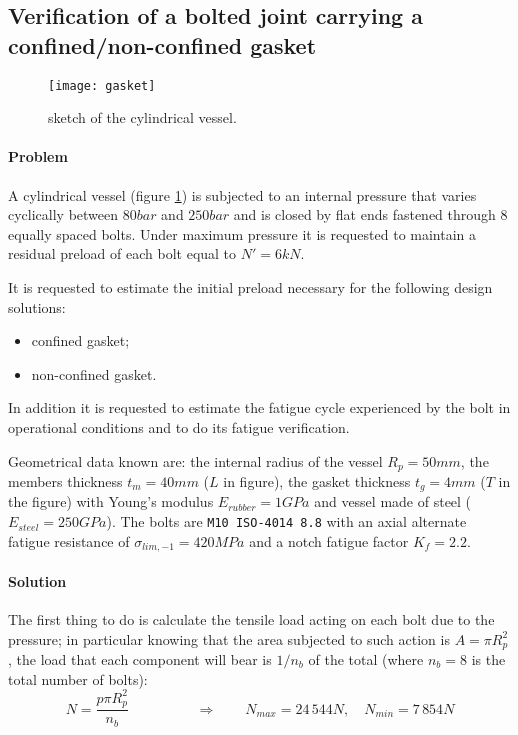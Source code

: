 \newpage
\subsection{Verification of a bolted joint carrying a confined/non-confined gasket}
	
	\begin{figure}[b!]
		\centering\texttt{[image: gasket]}
		\caption{sketch of the cylindrical vessel.} \label{ex:vessel}
	\end{figure}
	
	\paragraph{Problem} A cylindrical vessel (figure \ref{ex:vessel}) is subjected to an internal pressure that varies cyclically between $80bar$ and $250bar$ and is closed by flat ends fastened through 8 equally spaced bolts. Under maximum pressure it is requested to maintain a residual preload of each bolt equal to $N' = 6kN$. 
	
	It is requested to estimate the initial preload necessary for the following design solutions:
	\begin{itemize}
		\item confined gasket;
		\item non-confined gasket.
	\end{itemize}
	In addition it is requested to estimate the fatigue cycle experienced by the bolt in operational conditions and to do its fatigue verification.
	
	Geometrical data known are: the internal radius of the vessel $R_p = 50mm$, the members thickness $t_m=40mm$ ($L$ in figure), the gasket thickness $t_g = 4mm$ ($T$ in the figure) with Young's modulus $E_{rubber} = 1GPa$ and vessel made of steel ($E_{steel} =250 GPa$). The bolts are \texttt{M10 ISO-4014 8.8} with an axial alternate fatigue resistance of $\sigma_{lim,-1} = 420 MPa$ and a notch fatigue factor $K_f = 2.2$.
	
	\paragraph{Solution} The first thing to do is calculate the tensile load acting on each bolt due to the pressure; in particular knowing that the area subjected to such action is $A = \pi R_p^2$, the load that each component will bear is $1/n_b$ of the total (where $n_b = 8$ is the total number of bolts):
	\[ N = \frac{p \pi R_p^2}{n_b} \hspace{2cm} \Rightarrow \qquad N_{max} = 24\,544 N , \quad N_{min} = 7\,854N \]
	
